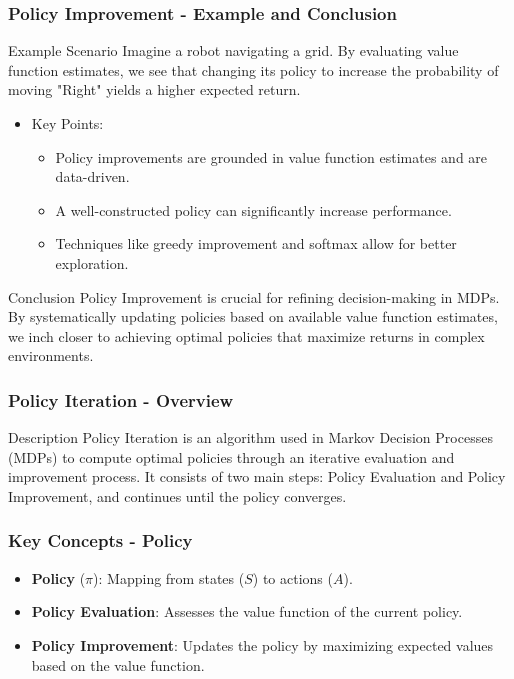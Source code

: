 \documentclass[aspectratio=169]{beamer}
\begin{document}
\begin{frame}[fragile]
    \frametitle{Policy Improvement - Example and Conclusion}
    \begin{block}{Example Scenario}
        Imagine a robot navigating a grid. By evaluating value function estimates, we see that changing its policy to increase the probability of moving "Right" yields a higher expected return. 
    \end{block}
    \begin{itemize}
        \item Key Points:
        \begin{itemize}
            \item Policy improvements are grounded in value function estimates and are data-driven.
            \item A well-constructed policy can significantly increase performance.
            \item Techniques like greedy improvement and softmax allow for better exploration.
        \end{itemize}
    \end{itemize}
    \begin{block}{Conclusion}
        Policy Improvement is crucial for refining decision-making in MDPs. By systematically updating policies based on available value function estimates, we inch closer to achieving optimal policies that maximize returns in complex environments.
    \end{block}
\end{frame}

\begin{frame}[fragile]
    \frametitle{Policy Iteration - Overview}
    \begin{block}{Description}
        Policy Iteration is an algorithm used in Markov Decision Processes (MDPs) to compute optimal policies through an iterative evaluation and improvement process.
        It consists of two main steps: Policy Evaluation and Policy Improvement, and continues until the policy converges.
    \end{block}
\end{frame}

\begin{frame}[fragile]
    \frametitle{Key Concepts - Policy}
    \begin{itemize}
        \item \textbf{Policy} ($\pi$): Mapping from states ($S$) to actions ($A$).
        \item \textbf{Policy Evaluation}: Assesses the value function of the current policy.
        \item \textbf{Policy Improvement}: Updates the policy by maximizing expected values based on the value function.
    \end{itemize}
\end{frame}
\end{document}
